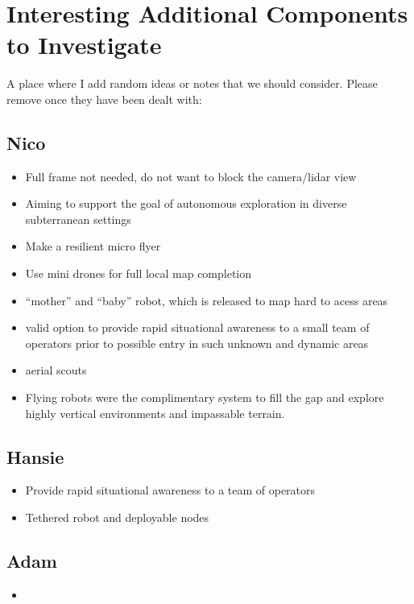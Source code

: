 \chapter{Interesting Additional Components to Investigate}

A place where I add random ideas or notes that we should consider. Please remove once they have been dealt with:


\section{Nico}
	\begin{itemize}
		\item Full frame not needed, do not want to block the camera/lidar view \cite{RMFOwl}
		\item Aiming to support the goal of autonomous exploration in diverse subterranean settings \cite{RMFOwl}
		\item Make a resilient micro flyer
		\item Use mini drones for full local map completion \cite{GraphBased}
		\item ``mother'' and ``baby'' robot, which is released to map hard to acess areas \cite{DarpaMultiRobot}
		\item valid option to provide rapid situational awareness to a small team of operators prior to possible entry in such unknown and dynamic areas \cite{Cerberus}
		\item aerial scouts \cite{Cerberus}
		\item Flying robots were the complimentary system to fill the gap and explore highly vertical environments and impassable terrain. \cite{Cerberus}
	\end{itemize}

\section{Hansie}
	\begin{itemize}
		\item Provide rapid situational awareness to a team of operators \cite{DarpaSynopsis}
		\item Tethered robot and deployable nodes \cite{Cerberus}
	\end{itemize}

\section{Adam}
	\begin{itemize}
		\item 
	\end{itemize}	